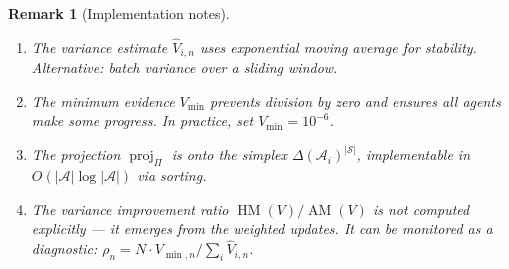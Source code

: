 \documentclass[11pt,a4paper]{article}
\newtheorem{remark}[theorem]{Remark}
\DeclareMathOperator{\proj}{proj}
\DeclareMathOperator{\AM}{AM}
\DeclareMathOperator{\HM}{HM}
\begin{document}
\begin{remark}[Implementation notes]
\begin{enumerate}
  \item The variance estimate $\hat{V}_{i,n}$ uses exponential moving average
    for stability. Alternative: batch variance over a sliding window.
  \item The minimum evidence $V_{\min}$ prevents division by zero and ensures
    all agents make some progress. In practice, set $V_{\min} = 10^{-6}$.
  \item The projection $\proj_\Pi$ is onto the simplex $\Delta(\mathcal{A}_i)^{|\mathcal{S}|}$,
    implementable in $O(|\mathcal{A}| \log |\mathcal{A}|)$ via sorting.
  \item The variance improvement ratio $\HM(V)/\AM(V)$ is not computed
    explicitly --- it emerges from the weighted updates. It can be monitored
    as a diagnostic: $\rho_n = N \cdot V_{\min,n} / \sum_i \hat{V}_{i,n}$.
\end{enumerate}
\end{remark}
\end{document}
